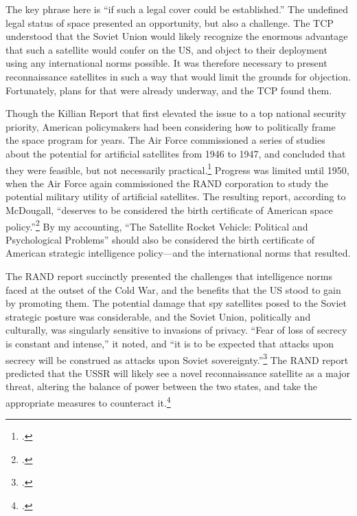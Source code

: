 \documentclass{report}
\begin{document}
The key phrase here is ``if such a legal cover could be established.'' The undefined legal status of space presented an opportunity, but also a challenge. The TCP understood that the Soviet Union would likely recognize the enormous advantage that such a satellite would confer on the US, and object to their deployment using any international norms possible.  It was therefore necessary to present reconnaissance satellites in such a way that would limit the grounds for objection. Fortunately, plans for that were already underway, and the TCP found them.

Though the Killian Report that first elevated the issue to a top national security priority, American policymakers had been considering how to politically frame the space program for years. The Air Force commissioned a series of studies about the potential for artificial satellites from 1946 to 1947, and concluded that they were feasible, but not necessarily practical.\footcite[p.~5-6]{peebles_corona_1997} Progress was limited until 1950, when  the Air Force again commissioned the RAND corporation to study the potential military utility of artificial satellites. The resulting report, according to McDougall, ``deserves to be considered the birth certificate of American space policy.''\footcite[p.~108]{mcdougall_heavens_1985} By my accounting, ``The Satellite Rocket Vehicle: Political and Psychological Problems'' should also be considered the birth certificate of American strategic intelligence policy---and the international norms that resulted.

The RAND report succinctly presented the challenges that intelligence norms faced at the outset of the Cold War, and the benefits that the US stood to gain by promoting them. The potential damage that spy satellites posed to the Soviet strategic posture was considerable, and the Soviet Union, politically and culturally, was singularly sensitive to invasions of privacy. ``Fear of loss of secrecy is constant and intense,'' it noted, and ``it is to be expected that attacks upon secrecy will be construed as attacks upon Soviet sovereignty.''\footcite[p.~14]{kecskemetic_satellite_1950} The RAND report predicted that the USSR will likely see a novel reconnaissance satellite as a major threat, altering the balance of power between the two states, and take the appropriate measures to counteract it.\footcite[p.~13]{kecskemetic_satellite_1950}
\end{document}
